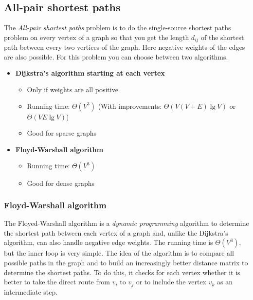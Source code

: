 %

\subsection{All-pair shortest paths}

The \emph{All-pair shortest paths} problem is to do the single-source shortest paths problem on every vertex of a graph so that you get the length $d_{ij}$ of the shortest path between every two vertices of the graph. Here negative weights of the edges are also possible. For this problem you can choose between two algorithms.

\begin{itemize}
    \item \textbf{Dijkstra's algorithm starting at each vertex}
    \begin{itemize}
        \item Only if weights are all positive
        \item Running time: $\Theta(V^3)$ (With improvements: $\Theta(V(V+E)\lg V)$ or $\Theta(VE\lg V)$)
        \item Good for sparse graphs
    \end{itemize}
    \item \textbf{Floyd-Warshall algorithm}
    \begin{itemize}
        \item Running time: $\Theta(V^3)$
        \item Good for dense graphs
    \end{itemize}
\end{itemize}

\subsubsection{Floyd-Warshall algorithm}

The Floyed-Warshall algorithm is a \emph{dynamic programming} algorithm to determine the shortest path between each vertex of a graph and, unlike the Dijkstra's algorithm, can also handle negative edge weights. The running time is $\Theta(V^3)$, but the inner loop is very simple. The idea of the algorithm is to compare all possible paths in the graph and to build an increasingly better distance matrix to determine the shortest paths. To do this, it checks for each vertex whether it is better to take the direct route from $v_i$ to $v_j$ or to include the vertex $v_k$ as an intermediate step.

